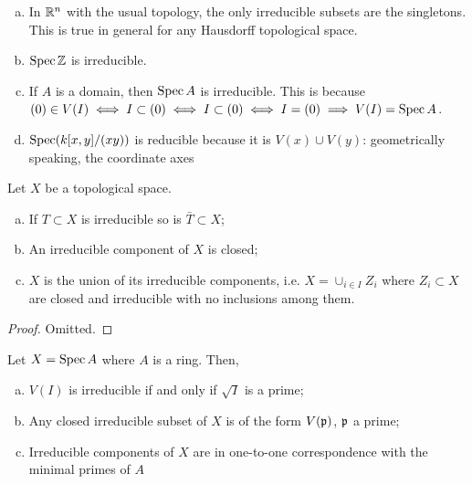 \documentclass{../mathnotes}
\begin{document}
\begin{exmp}\hspace{1mm}
\begin{enumerate}[(a)]
\item In $\mathbb{R}^n$ with the usual topology, the only irreducible subsets are the singletons. This is true in general for any Hausdorff topological space.
\item $\operatorname{Spec}\mathbb{Z}$ is irreducible.
\item If $A$ is a domain, then $\operatorname{Spec} A$ is irreducible. This is because $(0)\in V(I)\iff I\subset(0)\iff I\subset(0)\iff I=(0)\implies V(I)=\operatorname{Spec} A$.
\item $\operatorname{Spec}(k[x,y]/(xy))$ is reducible because it is $V(x)\cup V(y)$: geometrically speaking, the coordinate axes
\end{enumerate}
\end{exmp}

\begin{lem}
\label{L24}
Let $X$ be a topological space.
\begin{enumerate}[(a)]
\item If $T\subset X$ is irreducible so is $\bar T\subset X$;
\item An irreducible component of $X$ is closed;
\item $X$ is the union of its irreducible components, i.e. $X=\cup_{i\in I}Z_i$ where $Z_i\subset X$ are closed and irreducible with no inclusions among them. 
\end{enumerate}
\end{lem}
\begin{proof}
Omitted.
\end{proof}

\begin{lem}
\label{L25}
Let $X=\operatorname{Spec} A$ where $A$ is a ring. Then,
\begin{enumerate}[(a)]
\item $V(I)$ is irreducible if and only if $\sqrt{I}$ is a prime;
\item Any closed irreducible subset of $X$ is of the form $V(\mathfrak p)$, $\mathfrak p$ a prime;
\item Irreducible components of $X$ are in one-to-one correspondence with the minimal primes of $A$
\end{enumerate}
\end{lem}
\end{document}

